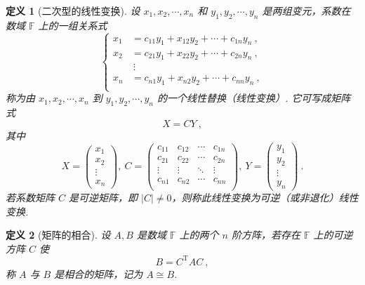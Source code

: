 \documentclass[zihao=-4,UTF8,linespread=1.8,nothm]{aytony_base}
\newtheorem{definition}{\indent 定义}[subsection]
\begin{document}
\begin{definition}[二次型的线性变换]
    设 ${x}_1, {x}_2, \cdots, {x}_{n}$ 和 ${y}_1, {y}_2, \cdots, {y}_{n}$ 是两组变元，系数在数域 $\mathbb{F}$ 上的一组关系式 $$
        \left\{
        \begin{aligned}
            x_1 & = c_{11}y_1 + x_{12}y_2 + \cdots + c_{1n}y_n\ , \\
            x_2 & = c_{21}y_1 + x_{22}y_2 + \cdots + c_{2n}y_n\ , \\
                & \ \vdots                                        \\
            x_n & = c_{n1}y_1 + x_{n2}y_2 + \cdots + c_{nn}y_n\ , \\
        \end{aligned}
        \right.
    $$ 称为由 ${x}_1, {x}_2, \cdots, {x}_{n}$ 到 ${y}_1, {y}_2, \cdots, {y}_{n}$ 的一个线性替换（线性变换）. 它可写成矩阵式 $$
        X = CY\ ,
    $$ 其中 $$
        X = \left(
        \begin{matrix}
                x_1 \\x_2\\\vdots\\x_n
            \end{matrix}
        \right),\ C = \left(
        \begin{matrix}
                c_{11} & c_{12} & \cdots & c_{1n} \\
                c_{21} & c_{22} & \cdots & c_{2n} \\
                \vdots & \vdots & \ddots & \vdots \\
                c_{n1} & c_{n2} & \cdots & c_{nn} \\
            \end{matrix}
        \right),\ Y = \left(
        \begin{matrix}
                y_1 \\y_2\\\vdots\\y_n
            \end{matrix}
        \right)\ .
    $$ 若系数矩阵 $C$ 是可逆矩阵，即 $|C| \neq 0$，则称此线性变换为可逆（或非退化）线性变换.
\end{definition}

\begin{definition}[矩阵的相合]
    设 $A, B$ 是数域 $\mathbb{F}$ 上的两个 $n$ 阶方阵，若存在 $\mathbb{F}$ 上的可逆方阵 $C$ 使 $$
        B = C ^{\mathrm{T}} AC\ ,
    $$ 称 $A$ 与 $B$ 是相合的矩阵，记为 $A \cong B$.
\end{definition}
\end{document}
